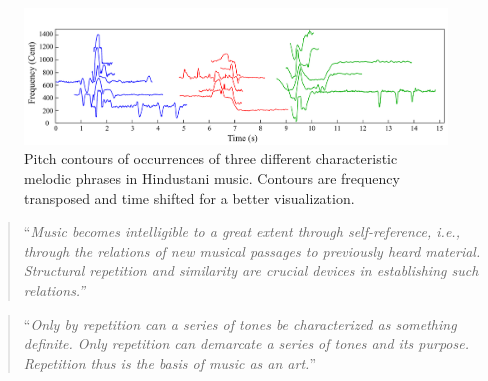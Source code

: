 \begin{figure}
	\begin{center}
		\includegraphics[width=\figSizeHundred]{ch01_introduction/figures/phraseClassesExample.pdf}
	\end{center}
	\caption[Examples of the characteristic melodic phrases in Hindustani Music]{Pitch contours of occurrences of three different characteristic melodic phrases in Hindustani music. Contours are frequency transposed and time shifted for a better visualization.}
	\label{fig:phraseComplexityExample_intro}
\end{figure}

\blockcquote[]{Cambouropoulos2006}{``\textit{Music becomes intelligible to a great extent through self-reference, i.e., through the relations of new musical passages to previously heard material. Structural repetition and similarity are crucial devices in establishing such relations.''}}

\blockcquote[]{schenker1980harmony}{``\textit{Only by repetition can a series of tones be characterized as something definite. Only repetition can demarcate a series of tones and its purpose. Repetition thus is the basis of music as an art.}''}


